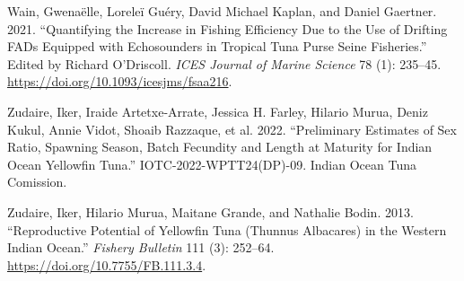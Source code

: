 \documentclass[
]{scrartcl}
\newlength{\cslhangindent}
\newenvironment{CSLReferences}[2] %
 {\begin{list}{}{%
  \setlength{\itemindent}{0pt}
  \setlength{\leftmargin}{0pt}
  \setlength{\parsep}{0pt}
  \ifodd #1
   \setlength{\leftmargin}{\cslhangindent}
   \setlength{\itemindent}{-1\cslhangindent}
  \fi
  \setlength{\itemsep}{#2\baselineskip}}}
 {\end{list}}
\begin{document}
\begin{CSLReferences}{1}{0}
Wain, Gwenaëlle, Loreleï Guéry, David Michael Kaplan, and Daniel
Gaertner. 2021. {``Quantifying the Increase in Fishing Efficiency Due to
the Use of Drifting {FADs} Equipped with Echosounders in Tropical Tuna
Purse Seine Fisheries.''} Edited by Richard O'Driscoll. \emph{ICES
Journal of Marine Science} 78 (1): 235--45.
\url{https://doi.org/10.1093/icesjms/fsaa216}.

Zudaire, Iker, Iraide Artetxe-Arrate, Jessica H. Farley, Hilario Murua,
Deniz Kukul, Annie Vidot, Shoaib Razzaque, et al. 2022. {``Preliminary
Estimates of Sex Ratio, Spawning Season, Batch Fecundity and Length at
Maturity for {Indian Ocean} Yellowfin Tuna.''} IOTC-2022-WPTT24(DP)-09.
Indian Ocean Tuna Comission.

Zudaire, Iker, Hilario Murua, Maitane Grande, and Nathalie Bodin. 2013.
{``Reproductive Potential of {Yellowfin Tuna} ({Thunnus} Albacares) in
the Western {Indian Ocean}.''} \emph{Fishery Bulletin} 111 (3): 252--64.
\url{https://doi.org/10.7755/FB.111.3.4}.

\end{CSLReferences}
\end{document}
